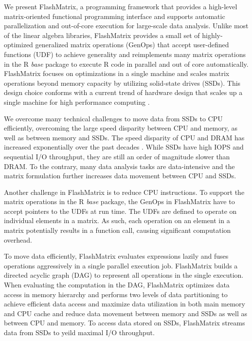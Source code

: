 We present FlashMatrix, a programming framework that provides a high-level
matrix-oriented functional programming interface and supports automatic
parallelization and out-of-core execution for large-scale data analysis.
Unlike most of the linear algebra libraries, FlashMatrix provides a small
set of highly-optimized generalized matrix operations (GenOps) that accept
user-defined functions (UDF) to achieve generality and reimplements many matrix
operations in the R \textit{base} package to execute R code in parallel and
out of core automatically. FlashMatrix focuses on optimizations in
a single machine and scales matrix operations beyond memory capacity by utilizing
solid-state drives (SSDs). This design choice conforms with a current trend of
hardware design that scales up a single machine for high performance computing
\cite{Ang14}.


We overcome many technical challenges to move data from SSDs to CPU efficiently,
overcoming the large speed disparity between CPU and memory, as well as between
memory and
SSDs. The speed disparity of CPU and DRAM has increased exponentially over
the past decades \cite{Wilkes01}. While SSDs have high IOPS and sequential
I/O throughput, they are still an order of magnitude slower than DRAM.
To the contrary, many data analysis tasks are data-intensive and the matrix
formulation further increases data movement between CPU and SSDs. 

Another challenge in FlashMatrix is to reduce CPU instructions. To support
the matrix operations in the R \textit{base} package, the GenOps in FlashMatrix
have to accept pointers to the UDFs at run time. The UDFs are defined to
operate on individual elements in a matrix. As such, each operation on an element
in a matrix potentially results in a function call, causing significant
computation overhead.

To move data efficiently, FlashMatrix evaluates expressions lazily and fuses
operations aggressively in a single parallel execution job.
FlashMatrix builds a directed acyclic graph (DAG) to represent all operations
in the single execution. When evaluating the computation in the DAG, FlashMatrix
optimizes data access in memory hierarchy and performs two levels of data
partitioning to achieve efficient data access and maximize data utilization in
both main memory and CPU cache and reduce data movement between memory and SSDs
as well as between CPU and memory. To access data stored on SSDs, FlashMatrix
streams data from SSDs to yeild maximal I/O throughput.


